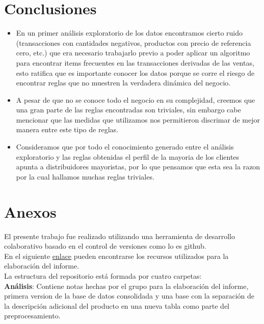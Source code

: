 \documentclass[]{article}
\begin{document}
	\section{Conclusiones}
	\begin{itemize}
		\item En un primer análisis exploratorio de los datos encontramos cierto ruido (transacciones con cantidades negativos, productos con precio de referencia cero, etc.) que era necesario trabajarlo previo a poder aplicar un algoritmo para encontrar items frecuentes en las transacciones derivadas de las ventas, esto ratifica que es importante conocer los datos porque se corre el riesgo de encontrar reglas que no muestren la verdadera dinámica del negocio.\\
		\item A pesar de que no se conoce todo el negocio en su complejidad, creemos que una gran parte de las reglas encontradas son triviales, sin embargo cabe mencionar que las medidas que utilizamos nos permitieron discrimar de mejor manera entre este tipo de reglas.\\
		\item Consideramos que por todo el conocimiento generado entre el análisis exploratorio y las reglas obtenidas el perfil de la mayoria de los clientes apunta a distribuidores mayoristas, por lo que pensamos que esta sea la razon por la cual hallamos muchas reglas triviales.\\
	\end{itemize}
	
	\section{Anexos}
	
	El presente trabajo fue realizado utilizando una herramienta de desarrollo colaborativo basado en el control de versiones como lo es github.\\
	
	\noindent En el siguiente \href{https://github.com/jairoji/DM_TP1/tree/master/TP1}{enlace} pueden encontrarse los recursos utilizados para la elaboración del informe.\\
	 
	
	\noindent La estructura del repositorio está formada por cuatro carpetas:\\
	
	\textbf{Análisis}: Contiene notas hechas por el grupo para la elaboración del informe, primera version de la base de datos consolidada y una base con la separación de la descripción adicional del producto en una nueva tabla como parte del preprocesamiento.\\
	
\end{document}
